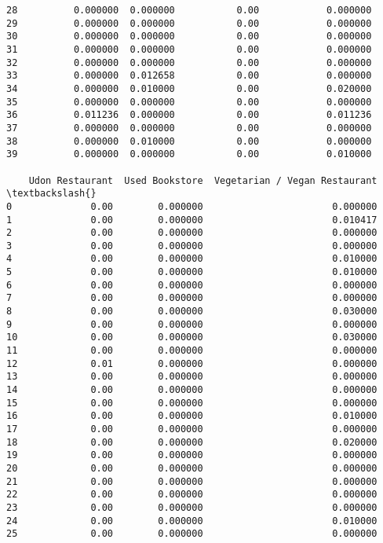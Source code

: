 \documentclass[11pt]{article}
\begin{document}
\begin{tcolorbox}[breakable, size=fbox, boxrule=.5pt, pad at break*=1mm, opacityfill=0]
\begin{Verbatim}[commandchars=\\\{\}]
28          0.000000  0.000000           0.00            0.000000
29          0.000000  0.000000           0.00            0.000000
30          0.000000  0.000000           0.00            0.000000
31          0.000000  0.000000           0.00            0.000000
32          0.000000  0.000000           0.00            0.000000
33          0.000000  0.012658           0.00            0.000000
34          0.000000  0.010000           0.00            0.020000
35          0.000000  0.000000           0.00            0.000000
36          0.011236  0.000000           0.00            0.011236
37          0.000000  0.000000           0.00            0.000000
38          0.000000  0.010000           0.00            0.000000
39          0.000000  0.000000           0.00            0.010000

    Udon Restaurant  Used Bookstore  Vegetarian / Vegan Restaurant  \textbackslash{}
0              0.00        0.000000                       0.000000
1              0.00        0.000000                       0.010417
2              0.00        0.000000                       0.000000
3              0.00        0.000000                       0.000000
4              0.00        0.000000                       0.010000
5              0.00        0.000000                       0.010000
6              0.00        0.000000                       0.000000
7              0.00        0.000000                       0.000000
8              0.00        0.000000                       0.030000
9              0.00        0.000000                       0.000000
10             0.00        0.000000                       0.030000
11             0.00        0.000000                       0.000000
12             0.01        0.000000                       0.000000
13             0.00        0.000000                       0.000000
14             0.00        0.000000                       0.000000
15             0.00        0.000000                       0.000000
16             0.00        0.000000                       0.010000
17             0.00        0.000000                       0.000000
18             0.00        0.000000                       0.020000
19             0.00        0.000000                       0.000000
20             0.00        0.000000                       0.000000
21             0.00        0.000000                       0.000000
22             0.00        0.000000                       0.000000
23             0.00        0.000000                       0.000000
24             0.00        0.000000                       0.010000
25             0.00        0.000000                       0.000000

\end{Verbatim}
\end{tcolorbox}
\end{document}
